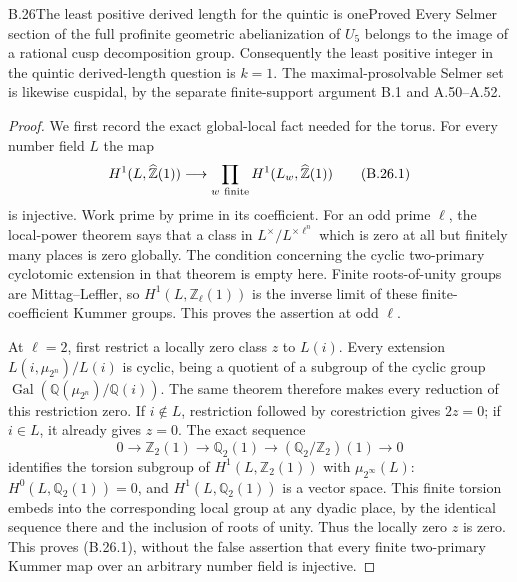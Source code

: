 \begin{statement}{B.26}{The least positive derived length for the quintic is one}{Proved}
Every Selmer section of the full profinite geometric
abelianization of $U_5$ belongs to the image of a rational
cusp decomposition group. Consequently the least positive
integer in the quintic derived-length question is $k=1$.
The maximal-prosolvable Selmer set is likewise cuspidal,
by the separate finite-support argument B.1 and A.50--A.52.
\end{statement}
\begin{proof}
We first record the exact global-local fact needed for
the torus. For every number field $L$ the map
\[
 H^1(L,\widehat{\mathbb Z}(1))
      \longrightarrow\prod_{w\ {\rm finite}}
                H^1(L_w,\widehat{\mathbb Z}(1))
                                                               \tag{B.26.1}
\]
is injective. Work prime by prime in its coefficient.
For an odd prime $\ell$, the local-power theorem
\citep[VIII, Theorem 1.4]{BMilneCFT2020} says that a
class in $L^\times/L^{\times\ell^n}$ which is zero
at all but finitely many places is zero globally.
The condition concerning the cyclic two-primary
cyclotomic extension in that theorem is empty here.
Finite roots-of-unity groups are Mittag--Leffler,
so $H^1(L,\mathbb Z_\ell(1))$ is the inverse limit
of these finite-coefficient Kummer groups.
This proves the assertion at odd $\ell$.

At $\ell=2$, first restrict a locally zero class
$z$ to $L(i)$. Every extension
$L(i,\mu_{2^n})/L(i)$ is cyclic, being a quotient
of a subgroup of the cyclic group
$\operatorname{Gal}(\mathbb Q(\mu_{2^n})/\mathbb Q(i))$.
The same theorem therefore makes every reduction
of this restriction zero. If $i\notin L$,
restriction followed by corestriction gives $2z=0$;
if $i\in L$, it already gives $z=0$.
The exact sequence
\[
 0\longrightarrow\mathbb Z_2(1)
 \longrightarrow\mathbb Q_2(1)
 \longrightarrow(\mathbb Q_2/\mathbb Z_2)(1)
 \longrightarrow0
\]
identifies the torsion subgroup of
$H^1(L,\mathbb Z_2(1))$ with
$\mu_{2^\infty}(L)$: $H^0(L,\mathbb Q_2(1))=0$,
and $H^1(L,\mathbb Q_2(1))$ is a vector space.
This finite torsion embeds into the corresponding
local group at any dyadic place, by the identical
sequence there and the inclusion of roots of unity.
Thus the locally zero $z$ is zero. This proves
(B.26.1), without the false assertion that every
finite two-primary Kummer map over an arbitrary
number field is injective.


\end{proof}
